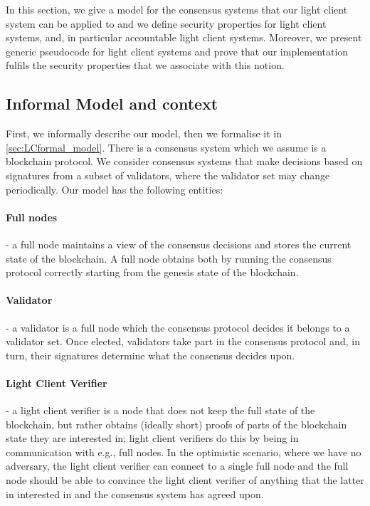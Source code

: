 \label{new_light_client}
In this section, we give a model for the consensus systems that our light client system can be applied to and we define security properties for light client systems,
and, in particular accountable light client systems. Moreover, we present generic pseudocode for light client systems and prove that our implementation 
fulfils the security properties that we associate with this notion.  

\subsection{Informal Model and context}
\label{sec:LCinformal_model}

First, we informally describe our model, then we formalise it in \ref{sec:LCformal_model}.
There is a consensus system which we assume is a blockchain protocol. 
We consider consensus systems that make decisions based on signatures from a subset of validators, where the validator set may change periodically. 
Our model has the following entities: 

\paragraph{Full nodes} - a full node maintains a view of the consensus decisions and stores the current state of the blockchain. 
A full node obtains both by running the consensus protocol correctly starting from the genesis state of the blockchain.

\paragraph{Validator} - a validator is a full node which the consensus protocol decides it belongs to a validator set. Once elected, 
validators take part in the consensus protocol and, in turn, their signatures determine what the consensus decides upon. 

\paragraph{Light Client Verifier} - a light client verifier is a node that does not keep the full state of the blockchain, but rather obtains (ideally short) proofs 
of parts of the blockchain state they are interested in; light client verifiers do this by being in communication with e.g., full nodes. In the optimistic scenario, 
where we have no adversary, the light client verifier can connect to a single full node and the full node should be able to convince the light client verifier of 
anything that the latter in interested in and the consensus system has agreed upon.

